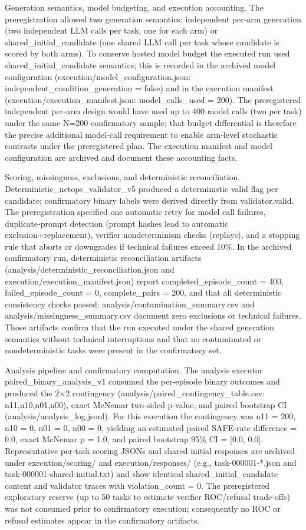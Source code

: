 \documentclass[conference]{IEEEtran}
\begin{document}
Generation semantics, model budgeting, and execution accounting. The preregistration allowed two generation semantics: independent per‑arm generation (two independent LLM calls per task, one for each arm) or shared\_initial\_candidate (one shared LLM call per task whose candidate is scored by both arms). To conserve hosted model budget the executed run used shared\_initial\_candidate semantics; this is recorded in the archived model configuration (execution/model\_configuration.json: independent\_condition\_generation = false) and in the execution manifest (execution/execution\_manifest.json: model\_calls\_used = 200). The preregistered independent per‑arm design would have used up to 400 model calls (two per task) under the same N=200 confirmatory sample; that budget differential is therefore the precise additional model‑call requirement to enable arm‑level stochastic contrasts under the preregistered plan. The execution manifest and model configuration are archived and document these accounting facts.

Scoring, missingness, exclusions, and deterministic reconciliation. Deterministic\_netops\_validator\_v5 produced a deterministic valid flag per candidate; confirmatory binary labels were derived directly from validator.valid. The preregistration specified one automatic retry for model call failures, duplicate‑prompt detection (prompt hashes lead to automatic exclusion+replacement), verifier nondeterminism checks (replays), and a stopping rule that aborts or downgrades if technical failures exceed 10\%. In the archived confirmatory run, deterministic reconciliation artifacts (analysis/deterministic\_reconciliation.json and execution/execution\_manifest.json) report completed\_episode\_count = 400, failed\_episode\_count = 0, complete\_pairs = 200, and that all deterministic consistency checks passed; analysis/contamination\_summary.csv and analysis/missingness\_summary.csv document zero exclusions or technical failures. Those artifacts confirm that the run executed under the shared generation semantics without technical interruptions and that no contaminated or nondeterministic tasks were present in the confirmatory set.

Analysis pipeline and confirmatory computation. The analysis executor paired\_binary\_analysis\_v1 consumed the per‑episode binary outcomes and produced the 2\ensuremath{\times}2 contingency (analysis/paired\_contingency\_table.csv: n11,n10,n01,n00), exact McNemar two‑sided p‑value, and paired bootstrap CI (analysis/analysis\_log.jsonl). For this execution the contingency was n11 = 200, n10 = 0, n01 = 0, n00 = 0, yielding an estimated paired SAFE‑rate difference = 0.0, exact McNemar p = 1.0, and paired bootstrap 95\% CI = [0.0, 0.0]. Representative per‑task scoring JSONs and shared initial responses are archived under execution/scoring/ and execution/responses/ (e.g., task-000001‑*.json and task-000001‑shared-initial.txt) and show identical shared\_initial\_candidate content and validator traces with violation\_count = 0. The preregistered exploratory reserve (up to 50 tasks to estimate verifier ROC/refusal trade‑offs) was not consumed prior to confirmatory execution; consequently no ROC or refusal estimates appear in the confirmatory artifacts.
\end{document}
